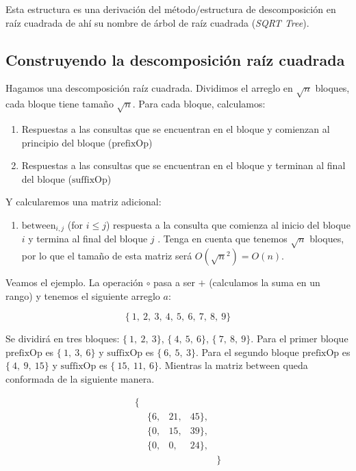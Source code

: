 Esta estructura es una derivación del método/estructura de descomposición en raíz cuadrada de ahí su nombre de árbol de raíz cuadrada (\emph{SQRT Tree}). 

\subsection{Construyendo la descomposición raíz cuadrada}

Hagamos una descomposición raíz cuadrada. Dividimos el arreglo en $\sqrt{n}$ bloques, cada bloque tiene tamaño $\sqrt{n}$. Para cada bloque, calculamos:

\begin{enumerate}
	\item Respuestas a las consultas que se encuentran en el bloque y comienzan al principio del bloque ($\text{prefixOp}$)
	\item Respuestas a las consultas que se encuentran en el bloque y terminan al final del bloque ($\text{suffixOp}$)
\end{enumerate} 

Y calcularemos una matriz adicional:

\begin{enumerate}
	\item $\text{between}_{i, j}$ (for $i \le j$) respuesta a la consulta que comienza al inicio del bloque $i$ y termina al final del bloque $j$ . Tenga en cuenta que tenemos
	$\sqrt{n}$ bloques, por lo que el tamaño de esta matriz será $O(\sqrt{n}^2) = O(n)$.
\end{enumerate}

Veamos el ejemplo. La operación $\circ$ pasa a ser $+$ (calculamos la suma en un rango) y tenemos el siguiente arreglo $a$:

         $$\{~1,~2,~3,~4,~5,~6,~7,~8,~9\}$$

Se dividirá en tres bloques: $\{~1,~2,~3\}$, $\{~4,~5,~6\}$, $\{~7,~8,~9\}$. Para el primer bloque $\text{prefixOp}$ es $\{~1,~3,~6\}$ y $\text{suffixOp}$ es $\{~6,~5,~3\}$. Para el segundo bloque $\text{prefixOp}$ es $\{~4,~9,~15\}$ y $\text{suffixOp}$ es $\{~15,~11,~6\}$. Mientras la matriz $\text{between}$ queda conformada de la siguiente manera. 


$$
\begin{matrix}
 \{ &	&  &  & \\	
 &	\{6,& 21, & 45\}, & \\
 & \{0,& 15, & 39\},  & \\
 &	\{0,& 0, & 24\}, & \\
 &	&  &  &  \} 
\end{matrix}
$$

